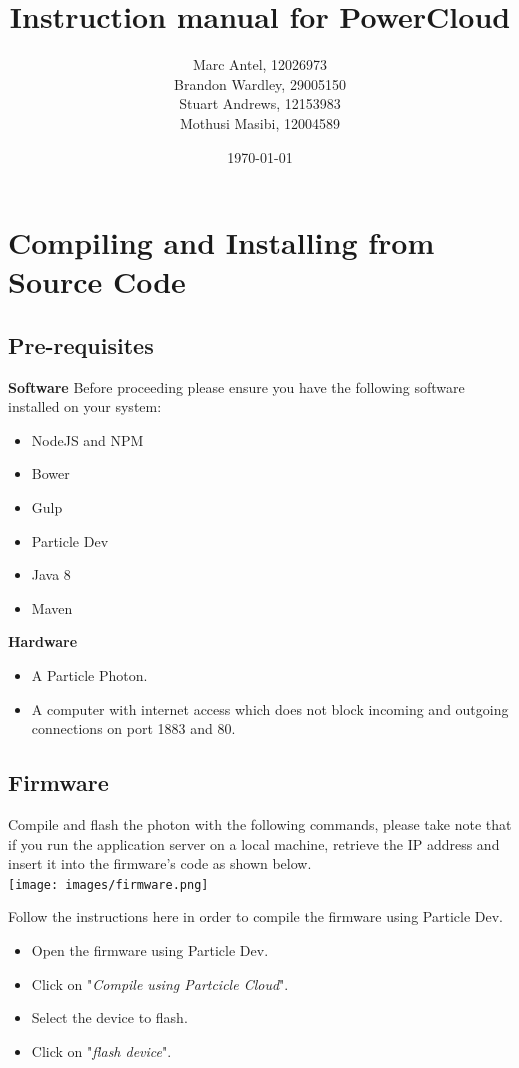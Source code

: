 \documentclass[a4paper,10pt]{article}
\title{Instruction manual for PowerCloud}
\author{Marc Antel, 12026973\\ Brandon Wardley, 29005150\\ Stuart Andrews, 12153983\\ Mothusi Masibi, 12004589}
\date{\today}
\begin{document}
	\maketitle
	\newpage
	\section{Compiling and Installing from Source Code}
	\subsection{Pre-requisites}
	\textbf{Software}
	Before proceeding please ensure you have the following software installed on your system:
	\begin{itemize}
		\item NodeJS and NPM
		\item Bower
		\item Gulp
		\item Particle Dev
		\item Java 8
		\item Maven
	\end{itemize}
	
	\textbf{Hardware}
	\begin{itemize}
		\item A Particle Photon.
		\item A computer with internet access which does not block incoming and outgoing connections on port 1883 and 80.
	\end{itemize}
	
	\subsection{Firmware}
	Compile and flash the photon with the following commands, please take note 
	that if you run the application server on a local machine, retrieve the IP 
	address and insert it into the firmware's code as shown below.\\
	
	\texttt{[image: images/firmware.png]}
	
	Follow the instructions here in order to compile the firmware using Particle 
	Dev.
	\\
	\begin{itemize}
		\item Open the firmware using Particle Dev.
		\item Click on "\textit{Compile using Partcicle Cloud}".
		\item Select the device to flash.
		\item Click on "\textit{flash device}".
	\end{itemize}
	
\end{document}
